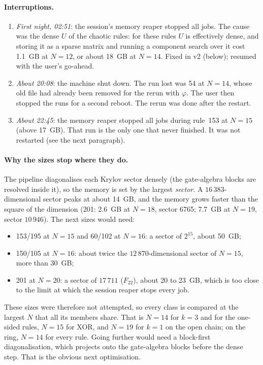 \paragraph{Interruptions.}
\begin{enumerate}
\item \emph{First night, 02:51}: the session's memory reaper stopped all jobs. The cause was the dense $U$ of the chaotic
  rules: for these rules $U$ is effectively dense, and storing it as a sparse matrix and running a component search
  over it cost 1.1~GB at $N=12$, or about 18~GB at $N=14$. Fixed in v2 (below); resumed with the user's go-ahead.
\item \emph{About 20:08}: the machine shut down. The run lost was 54 at $N=14$, whose old file had already been removed for
  the rerun with $\varphi$. The user then stopped the runs for a second reboot. The rerun was done after the restart.
\item \emph{About 22:45}: the memory reaper stopped all jobs during rule~153 at $N=15$ (above 17~GB). That run is the
  only one that never finished. It was not restarted (see the next paragraph).
\end{enumerate}

\paragraph{Why the sizes stop where they do.} The pipeline diagonalises each Krylov sector densely (the gate-algebra
blocks are resolved inside it), so the memory is set by the largest \emph{sector}. A $16\,383$-dimensional sector peaks at
about 14~GB, and the memory grows faster than the square of the dimension (201: 2.6~GB at $N=18$, sector 6765; 7.7~GB at
$N=19$, sector $10\,946$). The next sizes would need:
\begin{itemize}
\item 153/195 at $N=15$ and 60/102 at $N=16$: a sector of $2^{15}$, about 50~GB;
\item 150/105 at $N=16$: about twice the $12\,870$-dimensional sector of $N=15$, more than 30~GB;
\item 201 at $N=20$: a sector of $17\,711$ ($F_{22}$), about 20 to 23~GB, which is too close to the limit at which the
  session reaper stops every job.
\end{itemize}
These sizes were therefore not attempted, so every class is compared at the largest $N$ that all its members share. That
is $N=14$ for $k=3$ and for the one-sided rules, $N=15$ for XOR, and $N=19$ for $k=1$ on the open chain; on the ring,
$N=14$ for every rule. Going further would need a block-first diagonalisation, which projects onto the gate-algebra
blocks before the dense step. That is the obvious next optimisation.

